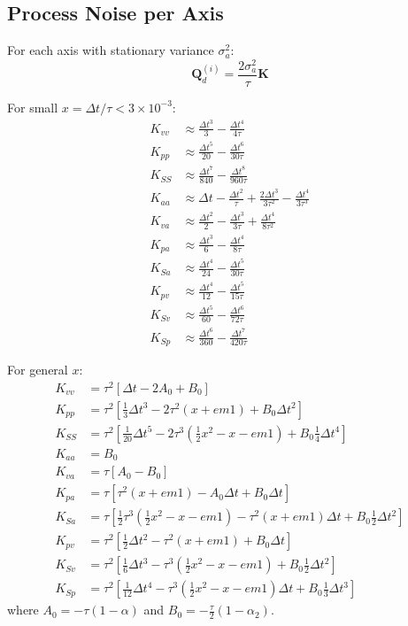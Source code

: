 \documentclass{article}
\newcommand{\vect}[1]{\bm{#1}}
\begin{document}
\subsection{Process Noise per Axis}

For each axis with stationary variance $\sigma_a^2$:
\begin{equation}
\vect{Q}_d^{(i)} = \frac{2\sigma_a^2}{\tau} \vect{K}
\end{equation}

For small $x = \Delta t/\tau < 3\times10^{-3}$:
\begin{align}
K_{vv} &\approx \frac{\Delta t^3}{3} - \frac{\Delta t^4}{4\tau} \\
K_{pp} &\approx \frac{\Delta t^5}{20} - \frac{\Delta t^6}{30\tau} \\
K_{SS} &\approx \frac{\Delta t^7}{840} - \frac{\Delta t^8}{960\tau} \\
K_{aa} &\approx \Delta t - \frac{\Delta t^2}{\tau} + \frac{2\Delta t^3}{3\tau^2} - \frac{\Delta t^4}{3\tau^3} \\
K_{va} &\approx \frac{\Delta t^2}{2} - \frac{\Delta t^3}{3\tau} + \frac{\Delta t^4}{8\tau^2} \\
K_{pa} &\approx \frac{\Delta t^3}{6} - \frac{\Delta t^4}{8\tau} \\
K_{Sa} &\approx \frac{\Delta t^4}{24} - \frac{\Delta t^5}{30\tau} \\
K_{pv} &\approx \frac{\Delta t^4}{12} - \frac{\Delta t^5}{15\tau} \\
K_{Sv} &\approx \frac{\Delta t^5}{60} - \frac{\Delta t^6}{72\tau} \\
K_{Sp} &\approx \frac{\Delta t^6}{360} - \frac{\Delta t^7}{420\tau}
\end{align}

For general $x$:
\begin{align}
K_{vv} &= \tau^2\left[\Delta t - 2A_0 + B_0\right] \\
K_{pp} &= \tau^2\left[\frac{1}{3}\Delta t^3 - 2\tau^2(x + em1) + B_0\Delta t^2\right] \\
K_{SS} &= \tau^2\left[\frac{1}{20}\Delta t^5 - 2\tau^3\left(\frac{1}{2}x^2 - x - em1\right) + B_0\frac{1}{4}\Delta t^4\right] \\
K_{aa} &= B_0 \\
K_{va} &= \tau\left[A_0 - B_0\right] \\
K_{pa} &= \tau\left[\tau^2(x + em1) - A_0\Delta t + B_0\Delta t\right] \\
K_{Sa} &= \tau\left[\frac{1}{2}\tau^3\left(\frac{1}{2}x^2 - x - em1\right) - \tau^2(x + em1)\Delta t + B_0\frac{1}{2}\Delta t^2\right] \\
K_{pv} &= \tau^2\left[\frac{1}{2}\Delta t^2 - \tau^2(x + em1) + B_0\Delta t\right] \\
K_{Sv} &= \tau^2\left[\frac{1}{6}\Delta t^3 - \tau^3\left(\frac{1}{2}x^2 - x - em1\right) + B_0\frac{1}{2}\Delta t^2\right] \\
K_{Sp} &= \tau^2\left[\frac{1}{12}\Delta t^4 - \tau^3\left(\frac{1}{2}x^2 - x - em1\right)\Delta t + B_0\frac{1}{3}\Delta t^3\right]
\end{align}
where $A_0 = -\tau(1 - \alpha)$ and $B_0 = -\frac{\tau}{2}(1 - \alpha_2)$.
\end{document}
